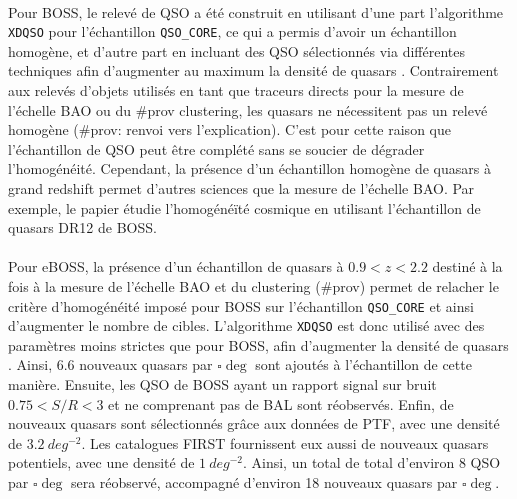 \documentclass[11pt, twoside, a4paper, openright]{report}
\begin{document}
\paragraph{} Pour BOSS, le relevé de QSO a été construit en utilisant d'une part l'algorithme \texttt{XDQSO} \autocite{Bovy2010a} pour l'échantillon \texttt{QSO\_CORE}, ce qui a permis d'avoir un échantillon homogène, et d'autre part en incluant des QSO sélectionnés via différentes techniques afin d'augmenter au maximum la densité de quasars \lya{}.
Contrairement aux relevés d'objets utilisés en tant que traceurs directs pour la mesure de l'échelle BAO ou du \#prov clustering, les quasars \lya{} ne nécessitent pas un relevé homogène (\#prov: renvoi vers l'explication).
C'est pour cette raison que l'échantillon de QSO \lya{} peut être complété sans se soucier de dégrader l'homogénéité.
Cependant, la présence d'un échantillon homogène de quasars à grand redshift permet d'autres sciences que la mesure de l'échelle BAO.
Par exemple, le papier \textcite{Laurent2016} étudie l'homogénéïté cosmique en utilisant l'échantillon de quasars DR12 de BOSS.



\paragraph{} Pour eBOSS, la présence d'un échantillon de quasars à $\num{0,9} < z < \num{2,2}$ destiné à la fois à la mesure de l'échelle BAO et du clustering (\#prov) permet de relacher le critère d'homogénéité imposé pour BOSS sur l'échantillon \texttt{QSO\_CORE} et ainsi d'augmenter le nombre de cibles.
L'algorithme \texttt{XDQSO} est donc utilisé avec des paramètres moins strictes que pour BOSS, afin d'augmenter la densité de quasars \lya{}.
Ainsi, \num{6,6} nouveaux quasars par $\si{\square\deg}$ sont ajoutés à l'échantillon de cette manière.
Ensuite, les QSO de BOSS ayant un rapport signal sur bruit $\num{0,75} < S/R < \num{3}$ et ne comprenant pas de BAL sont réobservés.
Enfin, de nouveaux quasars sont sélectionnés gr\^ace aux données de PTF, avec une densité de $\SI{3,2}{deg^{-2}}$. Les catalogues FIRST fournissent eux aussi de nouveaux quasars potentiels, avec une densité de $\SI{1}{deg^{-2}}$.
Ainsi, un total de total d'environ 8 QSO par $\si{\square\deg}$ sera réobservé, accompagné d'environ 18 nouveaux quasars par $\si{\square\deg}$.
\end{document}
